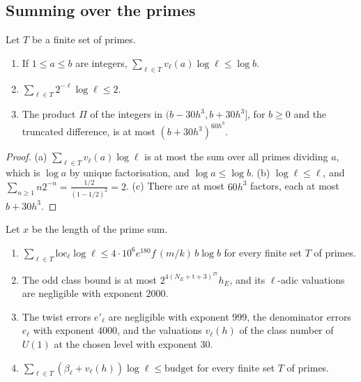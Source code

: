 \subsection{Summing over the primes}\label{ss:fit-sum}

\begin{lemma}\label{lem:fit-sums}
Let $T$ be a finite set of primes.
\begin{enumerate}[label=\textup{(\alph*)}]
\item If $1\le a\le b$ are integers, $\sum_{\ell\in T}v_\ell(a)\log\ell\le\log b$.
\item $\sum_{\ell\in T}2^{-\ell}\log\ell\le2$.
\item The product $\Pi$ of the integers in $(b-30h^3,b+30h^3]$, for $b\ge0$ and the truncated difference, is at most $(b+30h^3)^{60h^3}$.
\end{enumerate}
\end{lemma}

\begin{proof}
(a) $\sum_{\ell\in T}v_\ell(a)\log\ell$ is at most the sum over all primes dividing $a$, which is $\log a$ by unique factorisation, and $\log a\le\log b$. (b) $\log\ell\le\ell$, and $\sum_{n\ge1}n2^{-n}=\frac{1/2}{(1-1/2)^2}=2$. (c) There are at most $60h^3$ factors, each at most $b+30h^3$.
\end{proof}

\begin{proposition}\label{prop:fit-negligible}
Let $x$ be the length of the prime sum.
\begin{enumerate}[label=\textup{(\alph*)}]
\item $\sum_{\ell\in T}\mathrm{loc}_\ell\log\ell\le4\cdot10^6e^{180}f\,(m/k)\,b\log b$ for every finite set $T$ of primes.
\item The odd class bound is at most $2^{4(N_E+\mathrm t+3)^{27}}h_E$, and its $\ell$-adic valuations are negligible with exponent $2000$.
\item The twist errors $e'_\ell$ are negligible with exponent $999$, the denominator errors $e_\ell$ with exponent $4000$, and the valuations $v_\ell(h)$ of the class number of $U(1)$ at the chosen level with exponent $30$.
\item $\sum_{\ell\in T}(\beta_\ell+v_\ell(h))\log\ell\le\mathrm{budget}$ for every finite set $T$ of primes.
\end{enumerate}
\end{proposition}

